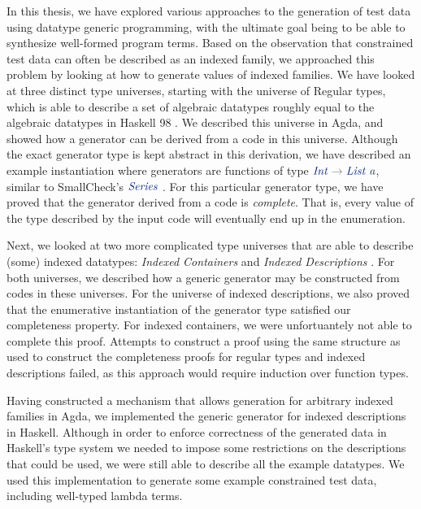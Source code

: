 \documentclass[a4paper,msc,twosized=semi]{uustthesis}
\newcommand*{\mathcolor}{}
\def\mathcolor#1#{\mathcoloraux{#1}}
\newcommand*{\mathcoloraux}[3]{%
  \protect\leavevmode
  \begingroup
    \color#1{#2}#3%
  \endgroup
}
\newcommand{\HSSym}[1]{\mathcolor{hsblue4}{#1}}
\newcommand{\HSCon}[1]{\mathcolor{hsblue3}{\mathit{#1}}}
\newcommand{\HSVar}[1]{\mathcolor{hsblue5}{\mathit{#1}}}
\begin{document}
  In this thesis, we have explored various approaches to the generation of test data using datatype generic programming, with the ultimate goal being to be able to synthesize well-formed program terms. Based on the observation that constrained test data can often be described as an indexed family, we approached this problem by looking at how to generate values of indexed families. We have looked at three distinct type universes, starting with the universe of Regular types, which is able to describe a set of algebraic datatypes roughly equal to the algebraic datatypes in Haskell 98 \cite{jones2003haskell}. We described this universe in Agda, and showed how a generator can be derived from a code in this universe. Although the exact generator type is kept abstract in this derivation, we have described an example instantiation where generators are functions of type \ensuremath{\HSCon{Int}\HSSym{\to} \HSCon{List}\;\HSVar{a}}, similar to SmallCheck's \ensuremath{\HSCon{Series}} \cite{runciman2008smallcheck}. For this particular generator type, we have proved that the generator derived from a code is \emph{complete}. That is, every value of the type described by the input code will eventually end up in the enumeration. 

  Next, we looked at two more complicated type universes that are able to describe (some) indexed datatypes: \emph{Indexed Containers} \cite{altenkirch2015indexed} and \emph{Indexed Descriptions} \cite{dagand2013cosmology}. For both universes, we described how a generic generator may be constructed from codes in these universes. For the universe of indexed descriptions, we also proved that the enumerative instantiation of the generator type satisfied our completeness property. For indexed containers, we were unfortuantely not able to complete this proof. Attempts to construct a proof using the same structure as used to construct the completeness proofs for regular types and indexed descriptions failed, as this approach would require induction over function types. 

  Having constructed a mechanism that allows generation for arbitrary indexed families in Agda, we implemented the generic generator for indexed descriptions in Haskell. Although in order to enforce correctness of the generated data in Haskell's type system we needed to impose some restrictions on the descriptions that could be used, we were still able to describe all the example datatypes. We used this implementation to generate some example constrained test data, including well-typed lambda terms. 
\end{document}
